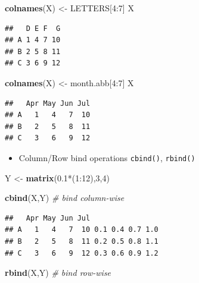 \documentclass[]{article}
\def\tightlist{}
\newenvironment{Shaded}{\begin{snugshade}}{\end{snugshade}}
\newcommand{\KeywordTok}[1]{\textcolor[rgb]{0.13,0.29,0.53}{\textbf{{#1}}}}
\newcommand{\DecValTok}[1]{\textcolor[rgb]{0.00,0.00,0.81}{{#1}}}
\newcommand{\FloatTok}[1]{\textcolor[rgb]{0.00,0.00,0.81}{{#1}}}
\newcommand{\StringTok}[1]{\textcolor[rgb]{0.31,0.60,0.02}{{#1}}}
\newcommand{\CommentTok}[1]{\textcolor[rgb]{0.56,0.35,0.01}{\textit{{#1}}}}
\newcommand{\NormalTok}[1]{{#1}}
\numberwithin{equation}{section}
\begin{document}
\begin{Shaded}
\begin{Highlighting}[]
\KeywordTok{colnames}\NormalTok{(X) <-}\StringTok{ }\NormalTok{LETTERS[}\DecValTok{4}\NormalTok{:}\DecValTok{7}\NormalTok{]}
\NormalTok{X}
\end{Highlighting}
\end{Shaded}

\begin{verbatim}
##   D E F  G
## A 1 4 7 10
## B 2 5 8 11
## C 3 6 9 12
\end{verbatim}

\begin{Shaded}
\begin{Highlighting}[]
\KeywordTok{colnames}\NormalTok{(X) <-}\StringTok{ }\NormalTok{month.abb[}\DecValTok{4}\NormalTok{:}\DecValTok{7}\NormalTok{]}
\NormalTok{X}
\end{Highlighting}
\end{Shaded}

\begin{verbatim}
##   Apr May Jun Jul
## A   1   4   7  10
## B   2   5   8  11
## C   3   6   9  12
\end{verbatim}

\begin{itemize}
\tightlist
\item
  Column/Row bind operations \texttt{cbind()}, \texttt{rbind()}
\end{itemize}

\begin{Shaded}
\begin{Highlighting}[]
\NormalTok{Y <-}\StringTok{ }\KeywordTok{matrix}\NormalTok{(}\FloatTok{0.1}\NormalTok{*(}\DecValTok{1}\NormalTok{:}\DecValTok{12}\NormalTok{),}\DecValTok{3}\NormalTok{,}\DecValTok{4}\NormalTok{)}

\KeywordTok{cbind}\NormalTok{(X,Y)  }\CommentTok{# bind column-wise}
\end{Highlighting}
\end{Shaded}

\begin{verbatim}
##   Apr May Jun Jul                
## A   1   4   7  10 0.1 0.4 0.7 1.0
## B   2   5   8  11 0.2 0.5 0.8 1.1
## C   3   6   9  12 0.3 0.6 0.9 1.2
\end{verbatim}

\begin{Shaded}
\begin{Highlighting}[]
\KeywordTok{rbind}\NormalTok{(X,Y)  }\CommentTok{# bind row-wise}
\end{Highlighting}
\end{Shaded}
\end{document}
